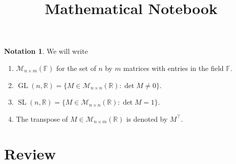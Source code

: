 \documentclass[]{article}
\title{Mathematical Notebook}
\author{}
\date{}
\DeclareMathOperator{\GL}{GL}
\DeclareMathOperator{\SL}{SL}
\newcommand {\RR}{\mathbb{R}}
\newcommand {\FF}{\mathbb{F}}
\theoremstyle{definition}
\newtheorem{notation}{Notation}
\begin{document}
\maketitle
\begin{notation} We will write
	\begin{enumerate}
		\item $\mathcal{M}_{n \times m}(\FF)$ for the set of $n$ by $m$ matrices with entries in the field $\FF$.
		\item $\GL(n, \RR) = \{ M \in \mathcal{M}_{n \times n} (\RR): \det M \neq 0 \}$.
		\item $\SL(n, \RR) = \{ M \in \mathcal{M}_{n \times n} (\RR): \det M = 1  \}$.
		\item The transpose of $M \in \mathcal{M}_{n \times m} (\RR) $ is denoted by $M^\intercal$.
	\end{enumerate}
\end{notation}

\section{Review}

\end{document}
